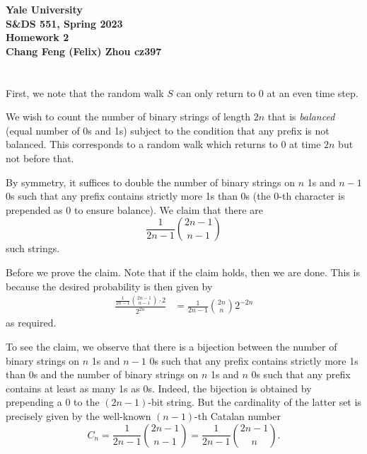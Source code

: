 \documentclass[10pt]{article}
\begin{document}
\begin{center}
    {\Large\textbf{Yale University}}\\
    \vspace{3mm}
    {\Large\textbf{S\&DS 551, Spring 2023}}\\
    \vspace{2mm}
    {\Large\textbf{Homework 2}}\\
    \vspace{3mm}
    \textbf{Chang Feng (Felix) Zhou cz397}
\end{center}

\section{}
First,
we note that the random walk $S$ can only return to 0
at an even time step.

We wish to count the number of binary strings of length $2n$
that is \emph{balanced} (equal number of 0s and 1s)
subject to the condition that any prefix is not balanced.
This corresponds to a random walk which returns to 0 at time $2n$
but not before that.

By symmetry,
it suffices to double the number of binary strings
on $n$ 1s and $n-1$ 0s such that any prefix contains strictly more 1s than 0s
(the $0$-th character is prepended as 0 to ensure balance).
We claim that there are
\[
  \frac1{2n-1} \binom{2n-1}{n-1}
\]
such strings.

Before we prove the claim.
Note that if the claim holds,
then we are done.
This is because the desired probability is then given by
\begin{align*}
  \frac{\frac1{2n-1} \binom{2n-1}{n-1} \cdot 2}{2^{2n}}
  &= \frac1{2n-1} \binom{2n}{n} 2^{-2n}
\end{align*}
as required.

To see the claim,
we observe that there is a bijection between 
the number of binary strings
on $n$ 1s and $n-1$ 0s such that any prefix contains strictly more 1s than 0s
and the number of binary strings
on $n$ 1s and $n$ 0s such that any prefix contains at least as many 1s as 0s.
Indeed,
the bijection is obtained by prepending a 0 to the $(2n-1)$-bit string.
But the cardinality of the latter set
is precisely given by the well-known $(n-1)$-th Catalan number
\[
  C_n
  = \frac1{2n-1} \binom{2n-1}{n-1}
  = \frac1{2n-1} \binom{2n-1}{n}.
\]
\end{document}
